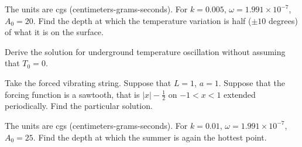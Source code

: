 \begin{exercise}
The units are cgs (centimeters-grams-seconds).
For $k=0.005$, $\omega = 1.991 \times {10}^{-7}$, $A_0 = 20$.
Find the depth at which the temperature variation is half ($\pm 10$
degrees) of what it is on the surface.
\end{exercise}

\begin{exercise}
Derive the solution for underground temperature oscillation without assuming
that $T_0 = 0$.
\end{exercise}

\setcounter{exercise}{100}

\begin{exercise}
Take the forced vibrating string.
Suppose that $L=1$, $a=1$.  Suppose that the forcing function
is a sawtooth, that is $\lvert x \rvert -\frac{1}{2}$
on $-1 < x < 1$ extended periodically.
Find the particular solution.
\end{exercise}

\begin{exercise}
The units are cgs (centimeters-grams-seconds).
For $k=0.01$, $\omega = 1.991 \times {10}^{-7}$, $A_0 = 25$.
Find the depth at which the summer is again the hottest point.
\end{exercise}
